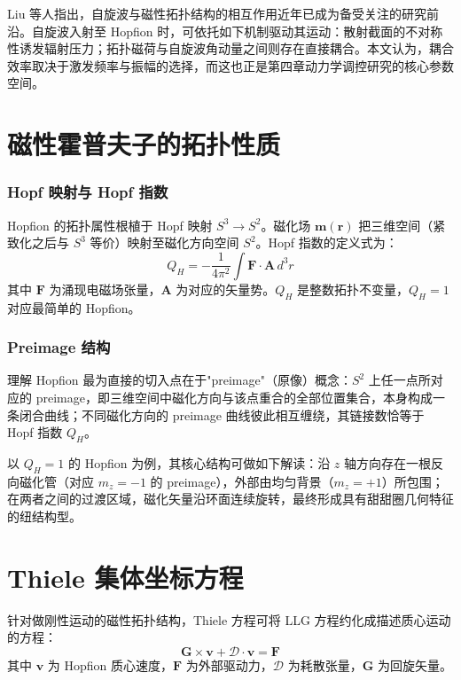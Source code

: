 \documentclass{article}
\begin{document}
Liu 等人\cite{liu2020three}指出，自旋波与磁性拓扑结构的相互作用近年已成为备受关注的研究前沿。自旋波入射至 Hopfion 时，可依托如下机制驱动其运动：散射截面的不对称性诱发辐射压力；拓扑磁荷与自旋波角动量之间则存在直接耦合。本文认为，耦合效率取决于激发频率与振幅的选择，而这也正是第四章动力学调控研究的核心参数空间。


\section{磁性霍普夫子的拓扑性质}

\subsubsection*{Hopf 映射与 Hopf 指数}
Hopfion 的拓扑属性根植于 Hopf 映射 $S^3 \to S^2$。磁化场 $\mathbf{m}(\mathbf{r})$ 把三维空间（紧致化之后与 $S^3$ 等价）映射至磁化方向空间 $S^2$。Hopf 指数的定义式为：
\begin{equation}
  Q_H = -\frac{1}{4\pi^2} \int \mathbf{F} \cdot \mathbf{A} \, d^3r
  \label{eq:hopf-index}
\end{equation}
其中 $\mathbf{F}$ 为涌现电磁场张量，$\mathbf{A}$ 为对应的矢量势。$Q_H$ 是整数拓扑不变量，$Q_H = 1$ 对应最简单的 Hopfion。

\subsubsection*{Preimage 结构}
理解 Hopfion 最为直接的切入点在于"preimage"（原像）概念：$S^2$ 上任一点所对应的 preimage，即三维空间中磁化方向与该点重合的全部位置集合，本身构成一条闭合曲线；不同磁化方向的 preimage 曲线彼此相互缠绕，其链接数恰等于 Hopf 指数 $Q_H$。

以 $Q_H = 1$ 的 Hopfion 为例，其核心结构可做如下解读：沿 $z$ 轴方向存在一根反向磁化管（对应 $m_z = -1$ 的 preimage），外部由均匀背景（$m_z = +1$）所包围；在两者之间的过渡区域，磁化矢量沿环面连续旋转，最终形成具有甜甜圈几何特征的纽结构型。


\section{Thiele 集体坐标方程}

针对做刚性运动的磁性拓扑结构，Thiele 方程可将 LLG 方程约化成描述质心运动的方程：
\begin{equation}
  \mathbf{G} \times \mathbf{v} + \mathcal{D} \cdot \mathbf{v} = \mathbf{F}
  \label{eq:thiele}
\end{equation}
其中 $\mathbf{v}$ 为 Hopfion 质心速度，$\mathbf{F}$ 为外部驱动力，$\mathcal{D}$ 为耗散张量，$\mathbf{G}$ 为回旋矢量。
\end{document}
